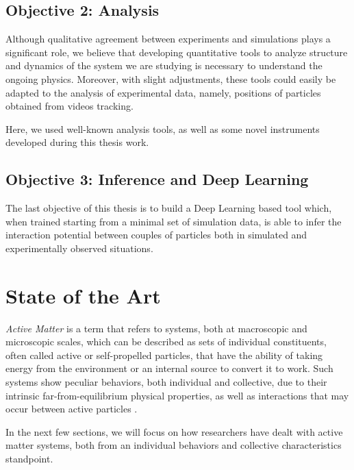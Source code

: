 \documentclass[../../master_thesis_np.tex]{subfiles}
\begin{document}
	\subsection{Objective 2: Analysis} %
	Although qualitative agreement between experiments and simulations plays a significant role, we believe that developing quantitative tools to analyze structure and dynamics of the system we are studying is necessary to understand the ongoing physics.
	Moreover, with slight adjustments, these tools could easily be adapted to the analysis of experimental data, namely, positions of particles obtained from videos tracking.
	
	Here, we used well-known analysis tools, as well as some novel instruments developed during this thesis work.
	
	\subsection{Objective 3: Inference and Deep Learning}
	The last objective of this thesis is to build a Deep Learning based tool which, when trained starting from a minimal set of simulation data, is able to infer the interaction potential between couples of particles both in simulated and experimentally observed situations.
	

	\section{State of the Art} \label{literature}
	
	\emph{Active Matter} is a term that refers to systems, both at macroscopic and microscopic scales, which can be described as sets of individual constituents, often called active or self-propelled particles, that have the ability of taking energy from the environment or an internal source to convert it to work. 
	Such systems show peculiar behaviors, both individual and collective, due to their intrinsic far-from-equilibrium physical properties, as well as interactions that may occur between active particles \cite{menon_active_2010, ramaswamy_active_2017}.
	
	In the next few sections, we will focus on how researchers have dealt with active matter systems, both from an individual behaviors and collective characteristics standpoint.
	
\end{document}
